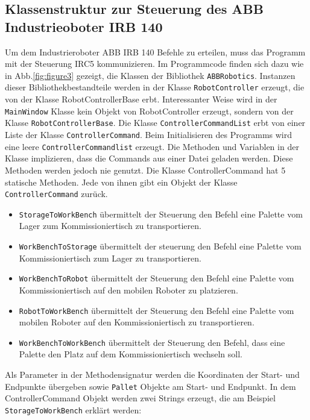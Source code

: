 \subsection{Klassenstruktur zur Steuerung des ABB Industrieoboter IRB 140}
Um dem Industrieroboter ABB IRB 140 Befehle zu erteilen, muss das Programm mit der Steuerung IRC5 kommunizieren.
Im Programmcode finden sich dazu wie in Abb.\ref{fig:figure3} gezeigt, die Klassen der Bibliothek \verb|ABBRobotics|.
Instanzen dieser Bibliothekbestandteile werden in der Klasse \verb|RobotController| erzeugt, die von der Klasse
RobotControllerBase erbt.
Interessanter Weise wird in der \verb|MainWindow| Klasse kein Objekt von RobotController erzeugt, sondern von der Klasse
\verb|RobotControllerBase|.
Die Klasse \verb|ControllerCommandList| erbt von einer Liste der Klasse \verb|ControllerCommand|.
Beim Initialisieren des Programms wird eine leere \verb|ControllerCommandlist| erzeugt.
Die Methoden und Variablen in der Klasse implizieren, dass die Commands aus einer Datei geladen werden.
Diese Methoden werden jedoch nie genutzt.
Die Klasse ControllerCommand hat 5 statische Methoden.
Jede von ihnen gibt ein Objekt der Klasse \verb|ControllerCommand| zurück.
\begin{itemize}
    \item \verb|StorageToWorkBench| übermittelt der Steuerung den Befehl eine Palette vom Lager zum Kommissioniertisch
    zu transportieren.
    \item \verb|WorkBenchToStorage| übermittelt der steuerung den Befehl eine Palette vom Kommissioniertisch zum Lager
    zu transportieren.
    \item \verb|WorkBenchToRobot| übermittelt der Steuerung den Befehl eine Palette vom Kommissioniertisch auf den
    mobilen Roboter zu platzieren.
    \item \verb|RobotToWorkBench| übermittelt der Steuerung den Befehl eine Palette vom mobilen Roboter auf den
    Kommissioniertisch zu transportieren.
    \item \verb|WorkBenchToWorkBench| übermittelt der Steuerung den Befehl, dass eine Palette den Platz auf dem
    Kommissioniertisch wechseln soll.

\end{itemize}
Als Parameter in der Methodensignatur werden die Koordinaten der Start- und Endpunkte übergeben
sowie \verb|Pallet| Objekte am Start- und Endpunkt.
In dem ControllerCommand Objekt werden zwei Strings erzeugt, die am Beispiel \verb|StorageToWorkBench| erklärt werden:
\newline
